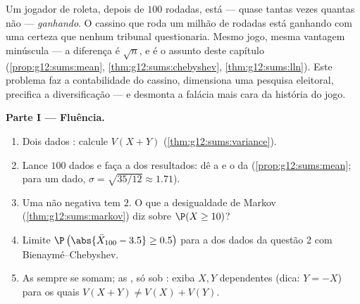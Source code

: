 \begin{problem}
\label{pb:g12:sums:1}
Um jogador de roleta, depois de $100$ rodadas, está --- quase
tantas vezes quantas não --- \emph{ganhando}. O cassino que roda
um milhão de rodadas está ganhando com uma certeza que nenhum
tribunal questionaria. Mesmo jogo, mesma vantagem minúscula ---
a diferença é $\sqrt n$, e é o assunto deste capítulo
(\cref{prop:g12:sums:mean}, \cref{thm:g12:sums:chebyshev},
\cref{thm:g12:sums:lln}). Este problema faz a contabilidade do
cassino, dimensiona uma pesquisa eleitoral, precifica a
diversificação --- e desmonta a falácia mais cara da história do
jogo.

\medskip
\noindent\textbf{Parte I --- Fluência.}
\begin{enumerate}
  \item Dois dados : calcule $V(X + Y)$
        (\cref{thm:g12:sums:variance}).
  \item Lance $100$ dados  e faça a  dos
        resultados: dê a  e o  da  (\cref{prop:g12:sums:mean}; para um dado,
        $\sigma = \sqrt{35/12} \approx 1.71$).
  \item Uma  não negativa tem  $2$.
        O que a desigualdade de Markov
        (\cref{thm:g12:sums:markov}) diz sobre
        $\P(X \geq 10)$?
  \item Limite $\P\left(\abs{\bar X_{100} - 3.5} \geq
        0.5\right)$ para a  dos dados da questão 2 com
        Bienaymé--Chebyshev.
  \item As  sempre se somam; as , só sob
        : exiba $X, Y$ dependentes (dica:
        $Y = -X$) para os quais
        $V(X + Y) \neq V(X) + V(Y)$.
\end{enumerate}


\end{problem}
